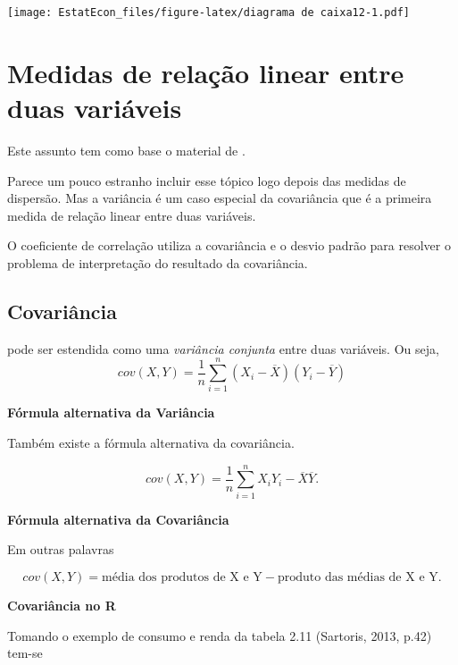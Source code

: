 \documentclass[
]{book}
\begin{document}
\texttt{[image: EstatEcon\_files/figure-latex/diagrama de caixa12-1.pdf]}

\hypertarget{medidas-de-relauxe7uxe3o-linear-entre-duas-variuxe1veis}{%
\section{Medidas de relação linear entre duas variáveis}\label{medidas-de-relauxe7uxe3o-linear-entre-duas-variuxe1veis}}

Este assunto tem como base o material de \citet{Sartoris2013}.

Parece um pouco estranho incluir esse tópico logo depois das medidas de dispersão. Mas a variância é um caso especial da covariância que é a primeira medida de relação linear entre duas variáveis.

O coeficiente de correlação utiliza a covariância e o desvio padrão para resolver o problema de interpretação do resultado da covariância.

\hypertarget{covariuxe2ncia}{%
\subsection{Covariância}\label{covariuxe2ncia}}

pode ser estendida como uma \emph{variância conjunta} entre duas variáveis. Ou seja,
\begin{equation*}
  cov(X,Y) = \frac{1}{n}\sum_{i=1}^{n}(X_i - \overline{X})(Y_i - \overline{Y})
\end{equation*}

\textbf{Fórmula alternativa da Variância}

Também existe a fórmula alternativa da covariância.

\begin{equation*}
  cov(X,Y) = \frac{1}{n}\sum_{i=1}^{n}X_{i}Y_{i} - \overline{X}\overline{Y}.
\end{equation*}

\textbf{Fórmula alternativa da Covariância}

Em outras palavras

\begin{equation*}
  cov(X,Y) = \text{média dos produtos de X e Y} - \text{produto das médias de X e Y}.
\end{equation*}

\textbf{Covariância no R}

Tomando o exemplo de consumo e renda da tabela 2.11 (Sartoris, 2013, p.42) tem-se
\end{document}

